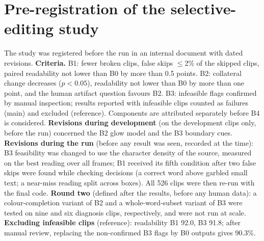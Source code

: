 

\section{Pre-registration of the selective-editing study}
\label{sec:supp_prereg}
The study was registered before the run in an internal document with dated revisions. \textbf{Criteria.} B1: fewer broken clips, false skips $\leq$2\% of the skipped clips, paired readability not lower than B0 by more than 0.5 points. B2: collateral change decreases ($p<0.05$), readability not lower than B0 by more than one point, and the human artifact question favours B2. B3: infeasible flags confirmed by manual inspection; results reported with infeasible clips counted as failures (main) and excluded (reference). Components are attributed separately before B4 is considered. \textbf{Revisions during development} (on the development clips only, before the run) concerned the B2 glow model and the B3 boundary cues. \textbf{Revisions during the run} (before any result was seen, recorded at the time): B3 feasibility was changed to use the character density of the source, measured on the best reading over all frames; B1 received its fifth condition after two false skips were found while checking decisions (a correct word above garbled small text; a near-miss reading split across boxes). All 526 clips were then re-run with the final code. \textbf{Round two} (defined after the results, before any human data): a colour-completion variant of B2 and a whole-word-subset variant of B3 were tested on nine and six diagnosis clips, respectively, and were not run at scale. \textbf{Excluding infeasible clips} (reference): readability B1 92.0, B3 91.8; after manual review, replacing the non-confirmed B3 flags by B0 outputs gives 90.3\%.

